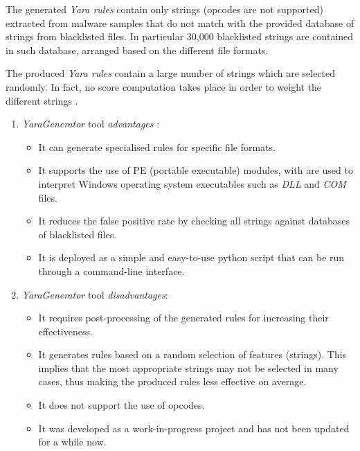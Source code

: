 \documentclass[pdfa%
,cucitura%
]{toptesi}
\begin{document}
The generated \textit{Yara rules} contain only strings (opcodes are not supported) extracted from malware samples that do not match with the provided database of strings from blacklisted files. In particular 30,000 blacklisted strings are contained in such database, arranged based on the different file formats.

The produced \textit{Yara rules} contain a large number of strings which are selected randomly. In fact, no score computation takes place in order to weight the different strings \cite{NaikEAGYRETE}.

\begin{enumerate}
	\item \textit{YaraGenerator} tool \textit{advantages} :
	\begin{itemize}
		\item It can generate specialised rules for specific file formats.
		
		\item It supports the use of PE (portable executable) modules, with are used to interpret Windows operating system executables such as \textit{DLL} and \textit{COM} files.
		
		\item It reduces the false positive rate by checking all strings against databases of blacklisted files.
		
		\item It is deployed as a simple and easy-to-use python script that can be run through a command-line interface.
	\end{itemize}
	
	\item \textit{YaraGenerator} tool \textit{disadvantages}:
	\begin{itemize}
		\item It requires post-processing of the generated rules for increasing their effectiveness.
		
		\item It generates rules based on a random selection of features (strings). This implies that the most appropriate strings may not be selected in many cases, thus making the produced rules less effective on average.
		
		\item It does not support the use of opcodes.
		
		\item It was developed as a work-in-progress project and has not been updated for a while now.
	\end{itemize}
\end{enumerate}
\end{document}
